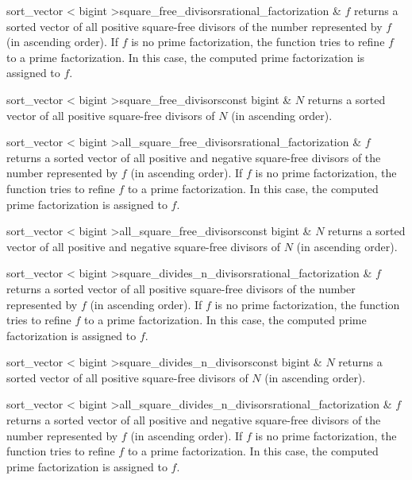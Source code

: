 \begin{fcode}{sort_vector < bigint >}{square_free_divisors}{rational_factorization & $f$}
  returns a sorted vector of all positive square-free divisors of the number represented by $f$
  (in ascending order).  If $f$ is no prime factorization, the function tries to refine $f$ to a
  prime factorization.  In this case, the computed prime factorization is assigned to $f$.
\end{fcode}

\begin{fcode}{sort_vector < bigint >}{square_free_divisors}{const bigint & $N$}
  returns a sorted vector of all positive square-free divisors of $N$ (in ascending order).
\end{fcode}

\begin{fcode}{sort_vector < bigint >}{all_square_free_divisors}{rational_factorization & $f$}
  returns a sorted vector of all positive and negative square-free divisors of the number
  represented by $f$ (in ascending order).  If $f$ is no prime factorization, the function tries
  to refine $f$ to a prime factorization.  In this case, the computed prime factorization is
  assigned to $f$.
\end{fcode}

\begin{fcode}{sort_vector < bigint >}{all_square_free_divisors}{const bigint & $N$}
  returns a sorted vector of all positive and negative square-free divisors of $N$ (in ascending
  order).
\end{fcode}

\begin{fcode}{sort_vector < bigint >}{square_divides_n_divisors}{rational_factorization & $f$}
  returns a sorted vector of all positive square-free divisors of the number represented by $f$
  (in ascending order).  If $f$ is no prime factorization, the function tries to refine $f$ to a
  prime factorization.  In this case, the computed prime factorization is assigned to $f$.
\end{fcode}

\begin{fcode}{sort_vector < bigint >}{square_divides_n_divisors}{const bigint & $N$}
  returns a sorted vector of all positive square-free divisors of $N$ (in ascending order).
\end{fcode}

\begin{fcode}{sort_vector < bigint >}{all_square_divides_n_divisors}{rational_factorization & $f$}
  returns a sorted vector of all positive and negative square-free divisors of the number
  represented by $f$ (in ascending order).  If $f$ is no prime factorization, the function tries
  to refine $f$ to a prime factorization.  In this case, the computed prime factorization is
  assigned to $f$.
\end{fcode}

